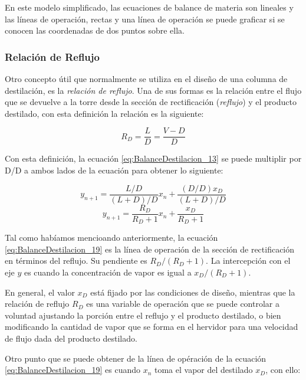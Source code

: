 \documentclass[11pt]{book}
\begin{document}
En este modelo simplificado, las ecuaciones de balance de materia son lineales
y las líneas de operación, rectas y una línea de operación se puede graficar si se conocen las coordenadas de dos puntos sobre ella.


\subsubsection{Relación de Reflujo}

Otro concepto útil que normalmente se utiliza en el diseño de una columna de destilación, es la \textit{relación de reflujo}. Una de sus formas es la relación entre el flujo que se devuelve a la torre desde la sección de rectificación (\textit{reflujo}) y el producto destilado, con esta definición la relación es la siguiente:

\begin{equation}
    \label{eq:BalanceDestilacion_18}
    R_D = \frac{L}{D} = \frac{V-D}{D}
\end{equation}

Con esta definición, la ecuación \ref{eq:BalanceDestilacion_13} se puede multiplir por D/D a ambos lados de la ecuación para obtener lo siguiente:

\begin{equation*}
    y_{n+1} = \frac{L/D}{(L+D)/D}x_n + \frac{(D/D) x_D}{(L+D)/D}
\end{equation*}
\begin{equation}
    \label{eq:BalanceDestilacion_19}
    y_{n+1} = \frac{R_D}{R_D + 1}x_n + \frac{x_D}{R_D + 1}
\end{equation}

Tal como habíamos mencioando anteriormente, la ecuación \ref{eq:BalanceDestilacion_19} es la línea de operación de la sección de rectificación en términos del reflujo. Su pendiente es $R_D/(R_D+1)$. La intercepción con el eje $y$ es cuando la concentración de vapor es igual a $x_D/(R_D + 1)$.

En general, el valor $x_D$ está fijado por las condiciones de diseño, mientras que la relación de reflujo $R_D$ es una variable de operación que se puede controlar a voluntad ajustando la porción entre el reflujo y el producto destilado, o bien modificando la cantidad de vapor que se forma en el hervidor para una velocidad de flujo dada del producto destilado. 

Otro punto que se puede obtener de la línea de opéración de la ecuación \ref{eq:BalanceDestilacion_19} es cuando $x_n$ toma el vapor del destilado $x_D$, con ello:
\end{document}
